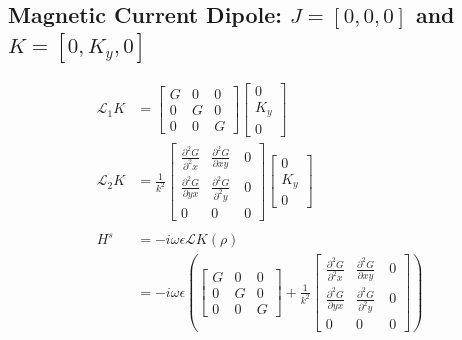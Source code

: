 \documentclass{article}
\newcommand{\0}{\varnothing}
\begin{document}
\subsection{Magnetic Current Dipole: $J = [0,0,0]$ and $K = [0,K_y,0]$}
\begin{minipage}{0.5\textwidth}
\begin{align*}
    \mathcal{L}_1 K &= 
    \left[ \begin{array}{ccc} G & 0 & 0 \\ 
                            0 & G & 0\\ 
                            0 & 0 & G \end{array} \right]
        \left[ \begin{array}{c} 
        0 \\ K_y \\ 0 \end{array} \right]\\
    \mathcal{L}_2 K &= \frac{1}{k^2} \left[ \begin{array}{ccc} \frac{\partial^2 G }{\partial^2 x} & \frac{\partial^2 G }{\partial xy}\ & 0 \\ 
                            \frac{\partial^2 G}{\partial yx} & \frac{\partial^2 G}{\partial^2 y} &0\\ 
                            0 & 0 &0 \end{array} \right]
                                    \left[ \begin{array}{c} 
                            0 \\ K_y \\ 0 \end{array} \right]\\
    \ \\
    H^s &= -i\omega\epsilon \mathcal{L} K (\rho) \\ &= -i\omega\epsilon 
    \left( \left[ \begin{array}{ccc} G & 0 & 0 \\ 
                            0 & G & 0\\ 
                            0 & 0 & G \end{array} \right] + \frac{1}{k^2} \left[ \begin{array}{ccc} \frac{\partial^2 G }{\partial^2 x} & \frac{\partial^2 G }{\partial xy}\ & 0 \\ 
                            \frac{\partial^2 G}{\partial yx} & \frac{\partial^2 G}{\partial^2 y} &0\\ 
                            0 & 0 &0 \end{array} \right] \right)

\end{align*}
\end{minipage}
\end{document}
